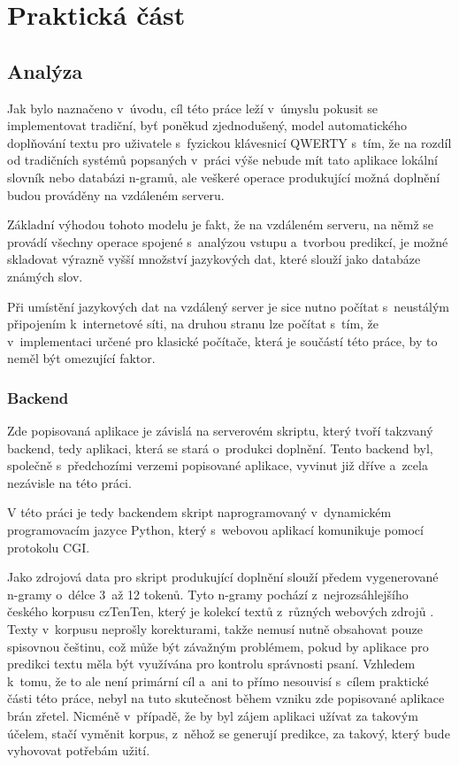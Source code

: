 \documentclass[a4paper,11pt,openany]{book} %
\begin{document}
\part{Praktická část}

\chapter{Analýza}

Jak bylo naznačeno v~úvodu, cíl této práce leží v~úmyslu pokusit se implementovat tradiční, byť poněkud zjednodušený, model automatického doplňování textu pro uživatele s~fyzickou klávesnicí QWERTY s~tím, že na rozdíl od tradičních systémů popsaných v~práci výše nebude mít tato aplikace lokální slovník nebo databázi n-gramů, ale veškeré operace produkující možná doplnění budou prováděny na vzdáleném serveru.

Základní výhodou tohoto modelu je fakt, že na vzdáleném serveru, na němž se provádí všechny operace spojené s~analýzou vstupu a~tvorbou predikcí, je možné skladovat výrazně vyšší množství jazykových dat, které slouží jako databáze známých slov.

Při umístění jazykových dat na vzdálený server je sice nutno počítat s~neustálým připojením k~internetové síti, na druhou stranu lze počítat s~tím, že v~implementaci určené pro klasické počítače, která je součástí této práce, by to neměl být omezující faktor. 

\section{Backend}

Zde popisovaná aplikace je závislá na serverovém skriptu, který tvoří takzvaný backend, tedy aplikaci, která se stará o~produkci doplnění. Tento backend byl, společně s~předchozími verzemi popisované aplikace, vyvinut již dříve a~zcela nezávisle na této práci. \parencite{neverilovaulipova2014}

V této práci je tedy backendem skript naprogramovaný v~dynamickém programovacím jazyce Python, který s~webovou aplikací komunikuje pomocí protokolu CGI. 

Jako zdrojová data pro skript produkující doplnění slouží předem vygenerované n-gramy o~délce 3~až 12 tokenů. Tyto n-gramy pochází z~nejrozsáhlejšího českého korpusu czTenTen, který je kolekcí textů z~různých webových zdrojů \parencite{suchomel2012}. Texty v~korpusu neprošly korekturami, takže nemusí nutně obsahovat pouze spisovnou češtinu, což může být závažným problémem, pokud by aplikace pro predikci textu měla být využívána pro kontrolu správnosti psaní. Vzhledem k~tomu, že to ale není primární cíl a~ani to přímo nesouvisí s~cílem praktické části této práce, nebyl na tuto skutečnost během vzniku zde popisované aplikace brán zřetel. Nicméně v~případě, že by byl zájem aplikaci užívat za takovým účelem, stačí vyměnit korpus, z~něhož se generují predikce, za takový, který bude vyhovovat potřebám užití.
\end{document}
